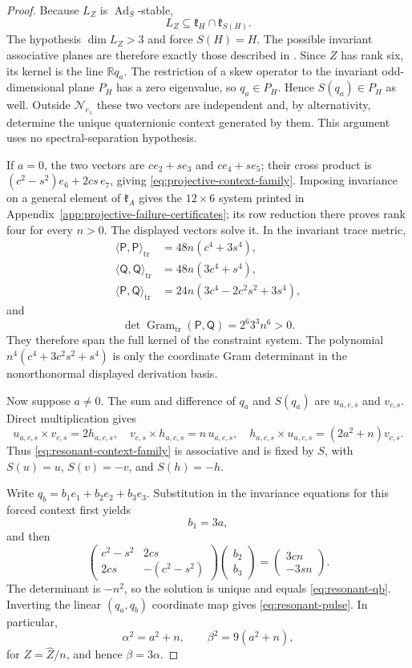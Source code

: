 \documentclass[11pt,a4paper]{article}
\newcommand{\RR}{\mathbb R}
\newcommand{\Ad}{\operatorname{Ad}}
\begin{document}
\begin{proof}
Because $L_Z$ is $\Ad_S$-stable,
\[
L_Z\subseteq\mathfrak k_H\cap\mathfrak k_{S(H)}.
\]
The hypothesis $\dim L_Z>3$ and  force $S(H)=H$.  The possible invariant associative planes are therefore exactly those described in .  Since $Z$ has rank six, its kernel is the line $\RR q_a$.  The restriction of a skew operator to the invariant odd-dimensional plane $P_H$ has a zero eigenvalue, so $q_a\in P_H$.  Hence $S(q_a)\in P_H$ as well.  Outside $\mathcal N_{e_1}$ these two vectors are independent and, by alternativity, determine the unique quaternionic context generated by them.  This argument uses no spectral-separation hypothesis.

If $a=0$, the two vectors are $ce_2+se_3$ and $ce_4+se_5$; their cross product is $(c^2-s^2)e_6+2cs\,e_7$, giving \eqref{eq:projective-context-family}.  Imposing invariance on a general element of $\mathfrak k_A$ gives the $12\times6$ system printed in Appendix~\ref{app:projective-failure-certificates}; its row reduction there proves rank four for every $n>0$.  The displayed vectors solve it.  In the invariant trace metric,
\begin{align*}
\langle\mathsf P,\mathsf P\rangle_{\mathrm{tr}}&=48n(c^4+3s^4),\\
\langle\mathsf Q,\mathsf Q\rangle_{\mathrm{tr}}&=48n(3c^4+s^4),\\
\langle\mathsf P,\mathsf Q\rangle_{\mathrm{tr}}&=24n(3c^4-2c^2s^2+3s^4),
\end{align*}
and
\[
\det\operatorname{Gram}_{\mathrm{tr}}(\mathsf P,\mathsf Q)
=2^6 3^3 n^6>0.
\]
They therefore span the full kernel of the constraint system.  The polynomial $n^4(c^4+3c^2s^2+s^4)$ is only the coordinate Gram determinant in the nonorthonormal displayed derivation basis.

Now suppose $a\ne0$.  The sum and difference of $q_a$ and $S(q_a)$ are $u_{a,c,s}$ and $v_{c,s}$.  Direct multiplication gives
\[
u_{a,c,s}\times v_{c,s}=2h_{a,c,s},
\quad
v_{c,s}\times h_{a,c,s}=n\,u_{a,c,s},
\quad
h_{a,c,s}\times u_{a,c,s}=(2a^2+n)v_{c,s}.
\]
Thus \eqref{eq:resonant-context-family} is associative and is fixed by $S$, with $S(u)=u$, $S(v)=-v$, and $S(h)=-h$.

Write $q_b=b_1e_1+b_2e_2+b_3e_3$.  Substitution in the invariance equations for this forced context first yields
\[
b_1=3a,
\]
and then
\[
\begin{pmatrix}c^2-s^2&2cs\\2cs&-(c^2-s^2)\end{pmatrix}
\begin{pmatrix}b_2\\b_3\end{pmatrix}
=
\begin{pmatrix}3cn\\-3sn\end{pmatrix}.
\]
The determinant is $-n^2$, so the solution is unique and equals \eqref{eq:resonant-qb}.  Inverting the linear $(q_a,q_b)$ coordinate map gives \eqref{eq:resonant-pulse}.  In particular,
\[
\alpha^2=a^2+n,
\qquad
\beta^2=9(a^2+n),
\]
for $Z=\widehat Z/n$, and hence $\beta=3\alpha$.


\end{proof}
\end{document}

